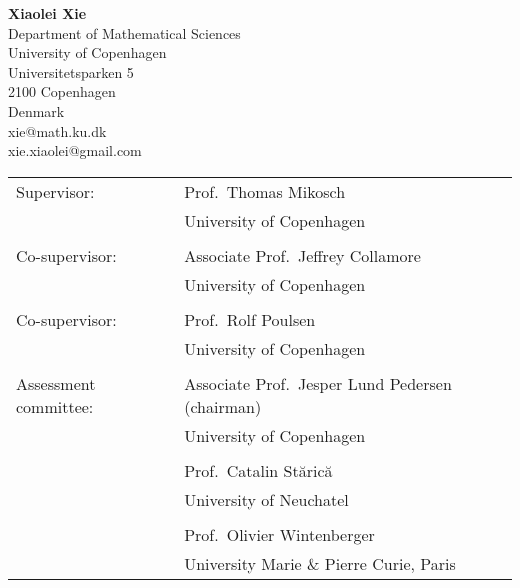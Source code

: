  


\usepackage[numbers,sort&compress]{natbib}
\usepackage{algorithm}
\usepackage{algpseudocode}
\usepackage{appendix}
\usepackage{pstricks, pst-barcode}
\usepackage{multirow}
\graphicspath{
        {../papers/FX/}{../papers/Jeffrey1/}
        {../papers/Anja/}
        {../papers/DavisMikoschHeinyXie/}
}





\frontmatter


\newpage
\leavevmode\thispagestyle{empty} 

\hspace*{0.5cm}  {\bf Xiaolei Xie}\\
\hspace*{1.5cm} Department of Mathematical Sciences\\
\hspace*{1.5cm} University of Copenhagen\\
\hspace*{1.5cm} Universitetsparken 5\\
\hspace*{1.5cm} 2100 Copenhagen\\
\hspace*{1.5cm} Denmark\\
\hspace*{1.5cm} xie@math.ku.dk\\
\hspace*{1.5cm} xie.xiaolei@gmail.com

\vspace*{3cm}

\begin{tabular}{ll}
Supervisor: & Prof.~Thomas Mikosch\\
& University of Copenhagen\\
& \\
Co-supervisor: & Associate Prof.~Jeffrey Collamore\\
& University of Copenhagen\\
& \\
Co-supervisor: & Prof.~Rolf Poulsen\\
& University of Copenhagen\\
& \\
Assessment committee:  & Associate Prof.~Jesper Lund Pedersen (chairman)\\
& University of Copenhagen\\
& \\

&  Prof.~Catalin St{\u{a}}ric{\u{a}}\\
& University of Neuchatel\\
& \\

& Prof.~Olivier Wintenberger\\
& University Marie \& Pierre Curie, Paris
\end{tabular}

